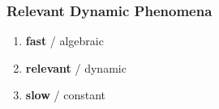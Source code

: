     \subsubsection{Relevant Dynamic Phenomena}
        \begin{minipage}{0.45\linewidth}
            \begin{center}
            \end{center}
        \end{minipage}
        \begin{minipage}{0.5\linewidth}
            \begin{enumerate}[label=\alph*)]
                \item \textbf{fast} / algebraic
                \item \textbf{relevant} / dynamic
                \item \textbf{slow} / constant
            \end{enumerate}
        \end{minipage}
        
        
        
    
